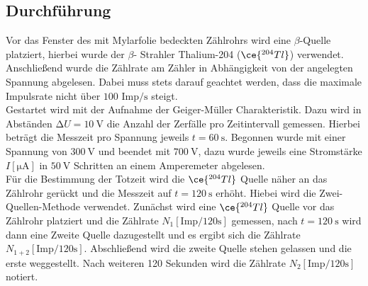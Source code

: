 \subsection{Durchführung}
Vor das Fenster des mit Mylarfolie bedeckten Zählrohrs wird eine $\beta$-Quelle platziert, hierbei wurde der $\beta$- Strahler Thalium-204 ($\ce{^{204}_{}Tl}$) verwendet. Anschließend wurde die Zählrate
am Zähler in Abhängigkeit von der angelegten Spannung abgelesen. Dabei muss stets darauf geachtet werden, dass die maximale Impulsrate nicht über $100$ $\text{Imp}/{\si{\second}}$ steigt. %
\newline
\\
Gestartet wird mit der Aufnahme der Geiger-Müller Charakteristik. Dazu wird in Abständen $\increment U = \SI{10}{\volt}$ die Anzahl der Zerfälle pro Zeitintervall gemessen. Hierbei beträgt die
Messzeit pro Spannung jeweils $t = \SI{60}{\second}$.
Begonnen wurde mit einer Spannung
von $\SI{300}{\volt}$ und beendet mit $\SI{700}{\volt}$, dazu wurde jeweils eine Stromstärke $I [\si{\micro\ampere}]$ in $\SI{50}{\volt}$ Schritten an einem Amperemeter abgelesen. 
\newline
\\
Für die Bestimmung der Totzeit wird die $\ce{^{204}_{}Tl}$ Quelle näher an das Zählrohr gerückt und die Messzeit auf $t = \SI{120}{\second}$ erhöht. Hiebei wird die Zwei-Quellen-Methode %
verwendet. Zunächst wird eine $\ce{^{204}_{}Tl}$ Quelle vor das Zählrohr platziert und die Zählrate $N_{1} [\text{Imp}/120{\si{\second}}]$ gemessen, nach $t = \SI{120}{\second}$ wird dann eine Zweite Quelle 
dazugestellt und es ergibt sich die Zählrate $N_{1+2} [\text{Imp}/120{\si{\second}}]$. Abschließend wird die zweite Quelle stehen gelassen und die erste weggestellt. Nach weiteren 120 Sekunden wird
die Zählrate  $N_{2} [\text{Imp}/120{\si{\second}}]$ notiert.
